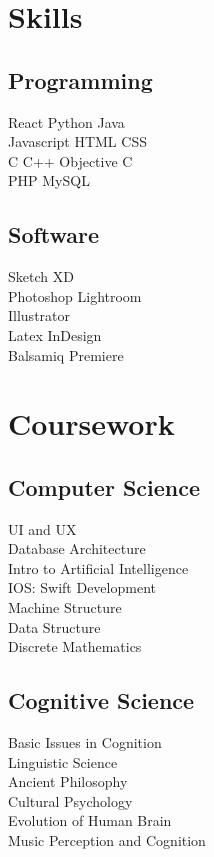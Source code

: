 \documentclass[]{deedy-resume-openfont}
\begin{document}
\begin{minipage}[t]{0.30\textwidth}
\section{Skills}
\subsection{Programming}
React \textbullet{} Python \textbullet{} Java\\
Javascript \textbullet{} HTML \textbullet{}   CSS \\
C \textbullet{} C++ \textbullet{} Objective C \\
PHP \textbullet{} MySQL  \\
\sectionsep

\subsection{Software}
Sketch \textbullet{} XD\\
Photoshop \textbullet{} Lightroom\\
Illustrator\\
Latex \textbullet{} InDesign\\
Balsamiq \textbullet{} Premiere\\
\sectionsep


\section{Coursework}

\subsection{Computer Science}
UI and UX\\
Database Architecture\\
Intro to Artificial Intelligence\\
IOS: Swift Development\\
Machine Structure\\
Data Structure\\
Discrete Mathematics\\
\sectionsep

\subsection{Cognitive Science}
Basic Issues in Cognition\\
Linguistic Science\\
Ancient Philosophy\\
Cultural Psychology\\
Evolution of Human Brain\\
Music Perception and Cognition\\
\sectionsep






\end{minipage}
\end{document}

